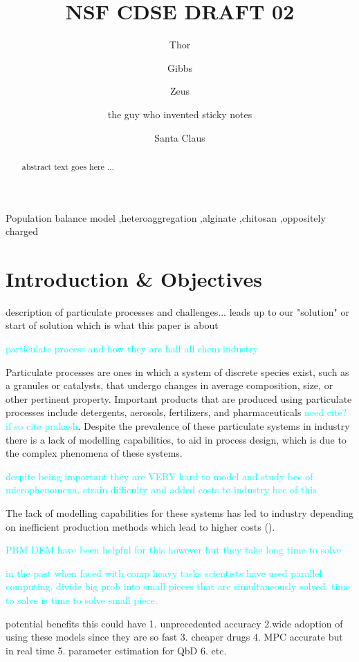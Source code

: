 \documentclass[preprint,11pt,authoryear]{elsarticle}
\begin{document}
	\begin{frontmatter}
	\title{ NSF CDSE DRAFT 02}
	\author{Thor }
	\author{Gibbs }
	\author{Zeus }
	\author{the guy who invented sticky notes }
	\author{Santa Claus} 
	\address{North Pole department of ice and snow Fwding address - Department of Chemical and Biochemical Engineering, Rutgers, The State University of New Jersey, Piscataway, NJ, USA 08854}
	\begin{abstract}
	 abstract text goes here ...
	\end{abstract}
	\begin{keyword}
	Population balance model \sep heteroaggregation \sep alginate  \sep chitosan \sep oppositely charged
	\end{keyword}
	\end{frontmatter}
	\linenumbers
	
	\section{Introduction \& Objectives} 
	description of particulate processes and challenges... leads up to our "solution" or start of solution which is what this paper is about 
	\par \textcolor{cyan}{particulate process and how they are half all chem industry}
	\par Particulate processes are ones in which a system of discrete species exist, such as a granules or catalysts, that undergo changes in average composition, size, or other pertinent property. Important products that are produced using particulate processes include detergents, aerosols, fertilizers, and pharmaceuticals \textcolor{cyan}{need cite? if so cite prakash}. Despite the prevalence of these particulate systems in industry there is a lack of modelling capabilities, to aid in process design, which is due to the complex phenomena of these systems.  
	\par \textcolor{cyan}{despite being important they are VERY hard to model and study bec of microphenomena. strain difficulty and added costs to industry bec of this}
	\par The lack of modelling capabilities for these systems has led to industry depending on inefficient production methods which lead to higher costs (\cite{Ramachandran2009}).
	\par \textcolor{cyan}{PBM DEM have been helpful for this however but they take long time to solve}
	\par \textcolor{cyan}{in the past when faced with comp heavy tasks scientists have used parallel computing. divide big prob into small pieces that are simultaneously solved. time to solve is time to solve small piece.} 
	\par potential benefits this could have 1. unprecedented accuracy 2.wide adoption of using these models since they are so fast 3. cheaper drugs 4. MPC accurate but in real time 5. parameter estimation for QbD 6. etc. 
	
\end{document}

